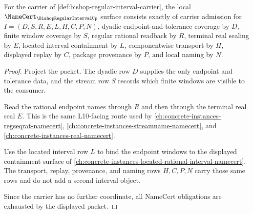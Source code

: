 \begin{theorem}
\label{thm:bishop-regular-interval-namecert-obligations}
For the carrier of \autoref{def:bishop-regular-interval-carrier}, the local $\NameCert_{\BishopRegularIntervalUp}$ surface consists exactly of carrier admission for $I=(D,S,R,E,L,H,C,P,N)$, dyadic endpoint-and-tolerance coverage by $D$, finite window coverage by $S$, regular rational readback by $R$, terminal real sealing by $E$, located interval containment by $L$, componentwise transport by $H$, displayed replay by $C$, package provenance by $P$, and local naming by $N$.
\end{theorem}
\begin{proof}
Project the packet. The dyadic row $D$ supplies the only endpoint and tolerance data, and the stream row $S$ records which finite windows are visible to the consumer.

Read the rational endpoint names through $R$ and then through the terminal real seal $E$. This is the same L10-facing route used by \autoref{ch:concrete-instances-regseqrat-namecert}, \autoref{ch:concrete-instances-streamname-namecert}, and \autoref{ch:concrete-instances-real-namecert}.

Use the located interval row $L$ to bind the endpoint windows to the displayed containment surface of \autoref{ch:concrete-instances-located-rational-interval-namecert}. The transport, replay, provenance, and naming rows $H,C,P,N$ carry those same rows and do not add a second interval object.

Since the carrier has no further coordinate, all NameCert obligations are exhausted by the displayed packet.
\end{proof}

